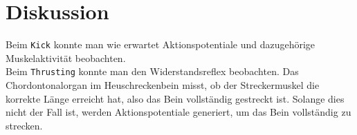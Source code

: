 \documentclass[a4paper]{article}
\begin{document}
\section{Diskussion}

Beim \texttt{Kick} konnte man wie erwartet Aktionspotentiale und dazugehörige Muskelaktivität beobachten. \\
Beim \texttt{Thrusting} konnte man den Widerstandsreflex beobachten. Das Chordontonalorgan im Heuschreckenbein misst, ob der Streckermuskel die korrekte Länge erreicht hat, also das Bein vollständig gestreckt ist. Solange dies nicht der Fall ist, werden Aktionspotentiale generiert, um das Bein vollständig zu strecken. 

\printbibliography
\end{document}

